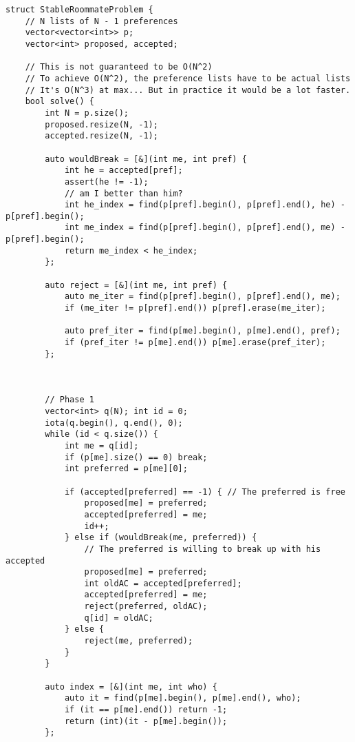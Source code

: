 \begin{lstlisting}
struct StableRoommateProblem {
    // N lists of N - 1 preferences
    vector<vector<int>> p;
    vector<int> proposed, accepted;

    // This is not guaranteed to be O(N^2)
    // To achieve O(N^2), the preference lists have to be actual lists
    // It's O(N^3) at max... But in practice it would be a lot faster.
    bool solve() {
        int N = p.size();
        proposed.resize(N, -1);
        accepted.resize(N, -1);

        auto wouldBreak = [&](int me, int pref) {
            int he = accepted[pref];
            assert(he != -1);
            // am I better than him?
            int he_index = find(p[pref].begin(), p[pref].end(), he) - p[pref].begin();
            int me_index = find(p[pref].begin(), p[pref].end(), me) - p[pref].begin();
            return me_index < he_index;
        };

        auto reject = [&](int me, int pref) {
            auto me_iter = find(p[pref].begin(), p[pref].end(), me);
            if (me_iter != p[pref].end()) p[pref].erase(me_iter);
            
            auto pref_iter = find(p[me].begin(), p[me].end(), pref);
            if (pref_iter != p[me].end()) p[me].erase(pref_iter);
        };



        // Phase 1
        vector<int> q(N); int id = 0;
        iota(q.begin(), q.end(), 0);
        while (id < q.size()) {
            int me = q[id];
            if (p[me].size() == 0) break;
            int preferred = p[me][0];

            if (accepted[preferred] == -1) { // The preferred is free
                proposed[me] = preferred;
                accepted[preferred] = me;
                id++;
            } else if (wouldBreak(me, preferred)) {
                // The preferred is willing to break up with his accepted
                proposed[me] = preferred;
                int oldAC = accepted[preferred];
                accepted[preferred] = me;
                reject(preferred, oldAC);
                q[id] = oldAC;
            } else {
                reject(me, preferred);
            }
        }

        auto index = [&](int me, int who) {
            auto it = find(p[me].begin(), p[me].end(), who);
            if (it == p[me].end()) return -1;
            return (int)(it - p[me].begin());
        };


\end{lstlisting}
